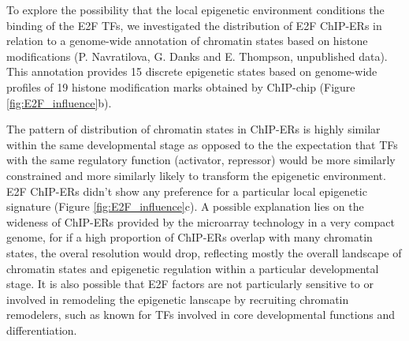 \documentclass[11pt,twoside,a4paper]{report}
\begin{document}
		To explore the possibility that the local epigenetic environment conditions the binding of the E2F TFs, we investigated the distribution of E2F ChIP-ERs in relation to a genome-wide annotation of chromatin states based on histone modifications (P. Navratilova, G. Danks and E. Thompson, unpublished data). This annotation provides 15 discrete epigenetic states based on genome-wide profiles of 19 histone modification marks obtained by ChIP-chip (Figure \ref{fig:E2F_influence}b). 
		
		The pattern of distribution of chromatin states in ChIP-ERs is highly similar within the same developmental stage as opposed to the the expectation that TFs with the same regulatory function (activator, repressor) would be more similarly constrained and more similarly likely to transform the epigenetic environment. E2F ChIP-ERs didn't show any preference for a particular local epigenetic signature (Figure \ref{fig:E2F_influence}c). A possible explanation lies on the wideness of ChIP-ERs provided by the microarray technology in a very compact genome, for if a high proportion of ChIP-ERs overlap with many chromatin states, the overal resolution would drop, reflecting mostly the overall landscape of chromatin states and epigenetic regulation within a particular developmental stage. It is also possible that E2F factors are not particularly sensitive to or involved in remodeling the epigenetic lanscape by recruiting chromatin remodelers, such as known for TFs involved in core developmental functions and differentiation.
		
\end{document}
